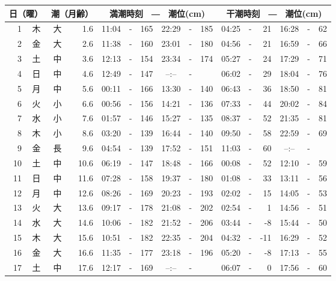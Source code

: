 \documentclass[12pt.a4j]{jsarticle}
\begin{document}
\begin{center}
\begin{table}[ht]
    \begin{tabular}{|rc|cr|ccrccr|ccrccr|}
    \hline
    \multicolumn{2}{|c|}{日（曜）} & \multicolumn{2}{c|}{潮（月齢）} & \multicolumn{6}{c|}{満潮時刻　―　潮位(cm)} & \multicolumn{6}{c|}{干潮時刻　―　潮位(cm)} \\
 \hline
 1 & 木 & 大 &  1.6 &  11:04 &-& 165  &  22:29 &-& 185  &   04:25 &-&  21  &   16:28 &-&  62  \\
 2 & 金 & 大 &  2.6 &  11:38 &-& 160  &  23:01 &-& 180  &   04:56 &-&  21  &   16:59 &-&  66  \\
 3 & 土 & 中 &  3.6 &  12:13 &-& 154  &  23:34 &-& 174  &   05:27 &-&  24  &   17:29 &-&  71  \\
 4 & 日 & 中 &  4.6 &  12:49 &-& 147  &  --:-- &-&     &   06:02 &-&  29  &   18:04 &-&  76  \\
 5 & 月 & 中 &  5.6 &  00:11 &-& 166  &  13:30 &-& 140  &   06:43 &-&  36  &   18:50 &-&  81  \\
 6 & 火 & 小 &  6.6 &  00:56 &-& 156  &  14:21 &-& 136  &   07:33 &-&  44  &   20:02 &-&  84  \\
 7 & 水 & 小 &  7.6 &  01:57 &-& 146  &  15:27 &-& 135  &   08:37 &-&  52  &   21:35 &-&  81  \\
 8 & 木 & 小 &  8.6 &  03:20 &-& 139  &  16:44 &-& 140  &   09:50 &-&  58  &   22:59 &-&  69  \\
 9 & 金 & 長 &  9.6 &  04:54 &-& 139  &  17:52 &-& 151  &   11:03 &-&  60  &   --:-- &-&     \\
10 & 土 & 中 & 10.6 &  06:19 &-& 147  &  18:48 &-& 166  &   00:08 &-&  52  &   12:10 &-&  59  \\
11 & 日 & 中 & 11.6 &  07:28 &-& 158  &  19:37 &-& 180  &   01:08 &-&  33  &   13:11 &-&  56  \\
12 & 月 & 中 & 12.6 &  08:26 &-& 169  &  20:23 &-& 193  &   02:02 &-&  15  &   14:05 &-&  53  \\
13 & 火 & 大 & 13.6 &  09:17 &-& 178  &  21:08 &-& 202  &   02:54 &-&   1  &   14:56 &-&  51  \\
14 & 水 & 大 & 14.6 &  10:06 &-& 182  &  21:52 &-& 206  &   03:44 &-&  -8  &   15:44 &-&  50  \\
15 & 木 & 大 & 15.6 &  10:51 &-& 182  &  22:35 &-& 204  &   04:32 &-& -11  &   16:29 &-&  52  \\
16 & 金 & 大 & 16.6 &  11:35 &-& 177  &  23:18 &-& 196  &   05:20 &-&  -8  &   17:13 &-&  55  \\
17 & 土 & 中 & 17.6 &  12:17 &-& 169  &  --:-- &-&     &   06:07 &-&   0  &   17:56 &-&  60  \\

\end{tabular}
\end{table}
\end{center}
\end{document}
